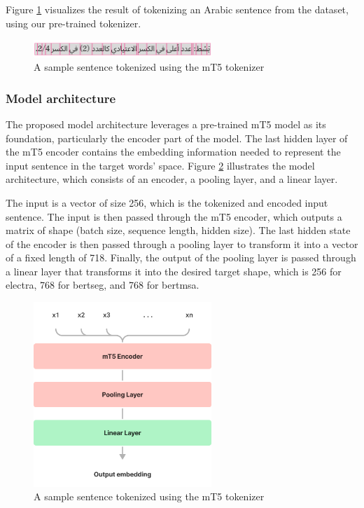 \documentclass[12.5pt]{article}
\begin{document}
Figure \ref{fig:tokenized-sentence} visualizes the result of tokenizing an Arabic sentence from the dataset, using our pre-trained tokenizer.

\begin{figure}[H]
    \centering
    \captionsetup{justification=centering}
    \includegraphics[width=0.6\textwidth]{tokenized-sentence.png}
    \caption{A sample sentence tokenized using the mT5 tokenizer}
    \label{fig:tokenized-sentence}
\end{figure}

\subsubsection{Model architecture}

The proposed model architecture leverages a pre-trained mT5 model as its foundation, particularly the encoder part of the model. The last hidden layer of the mT5 encoder contains the embedding information needed to represent the input sentence in the target words’ space. Figure \ref{fig:model-arch} illustrates the model architecture, which consists of an encoder, a pooling layer, and a linear layer.

The input is a vector of size 256, which is the tokenized and encoded input sentence. The input is then passed through the mT5 encoder, which outputs a matrix of shape (batch size, sequence length, hidden size). The last hidden state of the encoder is then passed through a pooling layer to transform it into a vector of a fixed length of 718. Finally, the output of the pooling layer is passed through a linear layer that transforms it into the desired target shape, which is 256 for electra, 768 for bertseg, and 768 for bertmsa.

\begin{figure}[H]
    \centering
    \captionsetup{justification=centering}
    \includegraphics[width=0.6\textwidth]{model-arch.png}
    \caption{A sample sentence tokenized using the mT5 tokenizer}
    \label{fig:model-arch}
\end{figure}
\end{document}
